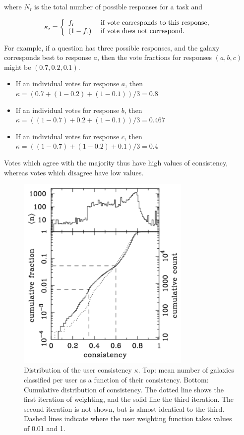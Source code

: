 \documentclass[useAMS,usenatbib]{mn2e}
\begin{document}
\noindent where $N_\mathrm{r}$ is the total number of possible responses for a task and

\begin{equation}
    \kappa_i = \left\{
    \begin{array}{l l}
      f_\mathrm{r}       & \text{ if vote corresponds to this response,} \\
      (1 - f_\mathrm{r}) & \text{ if vote does not correspond.}\\
    \end{array} \right.
    \label{eqn-consistency2}
 \end{equation}

For example, if a question has three possible responses, and the galaxy corresponds best to response $a$, then the vote fractions for responses $(a, b, c)$ might be $(0.7, 0.2, 0.1)$.
\begin{itemize}
\item If an individual votes for response $a$, then \\$\kappa = (0.7 + (1-0.2) + (1-0.1))/3 = 0.8$
\item If an individual votes for response $b$, then \\$\kappa = ((1-0.7) + 0.2 + (1-0.1))/3 = 0.467$
\item If an individual votes for response $c$, then \\$\kappa = ((1-0.7) + (1-0.2) + 0.1)/3 = 0.4$
\end{itemize}
\noindent Votes which agree with the majority thus have high values of consistency, whereas votes which disagree have low values.

\begin{figure}
\includegraphics[angle=0,width=3.3in]{figures/user_consistency.pdf}
\caption{Distribution of the user consistency $\kappa$. Top: mean number of galaxies classified per user as a function of their consistency. Bottom: Cumulative distribution of consistency. The dotted line shows the first iteration of weighting, and the solid line the third iteration. The second iteration is not shown, but is almost identical to the third. Dashed lines indicate where the user weighting function takes values of 0.01 and 1. 
\label{fig-consistency}}
\end{figure}
\end{document}
